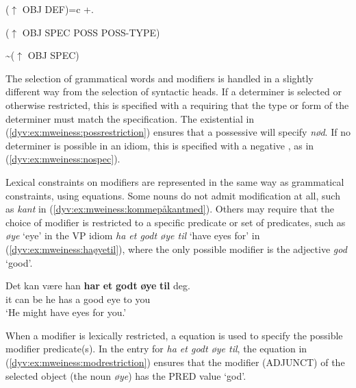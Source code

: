 \documentclass[output=paper]{langsci/langscibook}
\begin{document}
\ea\label{dyv:ex:mweiness:defrestriction}
{\small 
($\uparrow$ OBJ DEF)=c +.
}
\z

\ea\label{dyv:ex:mweiness:possrestriction}
{\small 
($\uparrow$ OBJ SPEC POSS POSS-TYPE) \\
}
\z


\ea\label{dyv:ex:mweiness:nospec}
{\small 
{\textasciitilde}($\uparrow$ OBJ SPEC) \\
}
\z

The selection of grammatical words and modifiers is handled in a slightly different way from the selection of syntactic heads.
If a determiner is selected or otherwise restricted, this is specified with a  requiring that the type or form of the determiner must match the specification.
The existential  in (\ref{dyv:ex:mweiness:possrestriction}) ensures that a possessive will specify \emph{nød}.
If no determiner is possible in an idiom, this is specified with a negative , as in (\ref{dyv:ex:mweiness:nospec}).

Lexical constraints on modifiers are represented in the same way as grammatical constraints, using equations. 
Some nouns do not admit modification at all, such as \emph{kant} in (\ref{dyv:ex:mweiness:kommepåkantmed}).
Others may require that the choice of modifier is restricted to a specific predicate or set of predicates, such as \textit{øye} `eye' in the VP idiom \emph{ha et godt øye til} `have eyes for' in (\ref{dyv:ex:mweiness:haøyetil}), where the only possible modifier is the adjective \emph{god} `good'.

\ea\label{dyv:ex:mweiness:haøyetil}
\gll Det kan være han \textbf{har} \textbf{et} \textbf{godt} \textbf{øye} \textbf{til} deg. \\
it can be he has a good eye to you \\
\glt `He might have eyes for you.' 
\z

When a modifier is lexically restricted, a  equation is used to specify the possible modifier predicate(s).
In the entry for \emph{ha et godt øye til}, the equation in (\ref{dyv:ex:mweiness:modrestriction}) ensures that the modifier (ADJUNCT) of the selected object (the noun \emph{øye}) has the PRED value `god'. 
\end{document}
